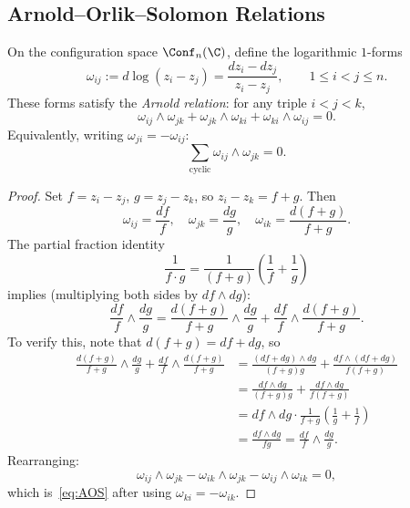 \subsection{Arnold--Orlik--Solomon Relations}
\label{subsec:arnold_complete}

\begin{theorem}
\label{thm:AOS_forms}
On the configuration space $\Conf_n(\C)$, define the logarithmic $1$-forms
\[
\omega_{ij} := d\log(z_i - z_j) = \frac{dz_i - dz_j}{z_i - z_j}, \qquad 1 \leq i < j \leq n.
\]
These forms satisfy the \emph{Arnold relation}: for any triple $i < j < k$,
\begin{equation}
\label{eq:AOS}
\omega_{ij} \wedge \omega_{jk} + \omega_{jk} \wedge \omega_{ki} + \omega_{ki} \wedge \omega_{ij} = 0.
\end{equation}
Equivalently, writing $\omega_{ji} = -\omega_{ij}$:
\[
\sum_{\text{cyclic}} \omega_{ij} \wedge \omega_{jk} = 0.
\]
\end{theorem}

\begin{proof}
Set $f = z_i - z_j$, $g = z_j - z_k$, so $z_i - z_k = f + g$. Then
\[
\omega_{ij} = \frac{df}{f}, \quad \omega_{jk} = \frac{dg}{g}, \quad \omega_{ik} = \frac{d(f+g)}{f+g}.
\]
The partial fraction identity
\[
\frac{1}{f \cdot g} = \frac{1}{(f+g)} \left(\frac{1}{f} + \frac{1}{g}\right)
\]
implies (multiplying both sides by $df \wedge dg$):
\[
\frac{df}{f} \wedge \frac{dg}{g} = \frac{d(f+g)}{f+g} \wedge \frac{dg}{g} + \frac{df}{f} \wedge \frac{d(f+g)}{f+g}.
\]
To verify this, note that $d(f+g) = df + dg$, so
\begin{align*}
\frac{d(f+g)}{f+g} \wedge \frac{dg}{g} + \frac{df}{f} \wedge \frac{d(f+g)}{f+g}
&= \frac{(df+dg) \wedge dg}{(f+g)g} + \frac{df \wedge (df+dg)}{f(f+g)} \\
&= \frac{df \wedge dg}{(f+g)g} + \frac{df \wedge dg}{f(f+g)} \\
&= df \wedge dg \cdot \frac{1}{f+g}\left(\frac{1}{g} + \frac{1}{f}\right) \\
&= \frac{df \wedge dg}{fg} = \frac{df}{f} \wedge \frac{dg}{g}.
\end{align*}
Rearranging:
\[
\omega_{ij} \wedge \omega_{jk} - \omega_{ik} \wedge \omega_{jk} - \omega_{ij} \wedge \omega_{ik} = 0,
\]
which is~\eqref{eq:AOS} after using $\omega_{ki} = -\omega_{ik}$.
\end{proof}

